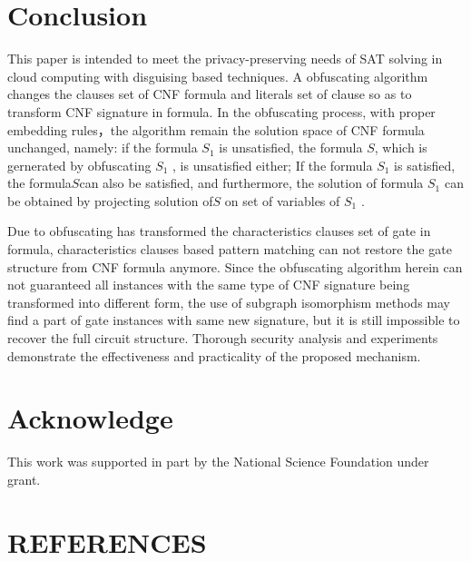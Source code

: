 \documentclass[runningheads,a4paper]{llncs}
\begin{document}
\section{Conclusion} 

This paper is intended to meet the privacy-preserving needs of SAT solving in cloud computing with disguising based techniques.
A obfuscating algorithm changes the clauses set of CNF formula and literals set of clause so as to transform CNF signature in formula. 
In the obfuscating process, with proper embedding rules，the algorithm remain the solution space of CNF formula unchanged, 
namely: if the formula $S_1$  is unsatisfied, the formula $S$, which is gernerated by obfuscating $S_1$ , is unsatisfied either;
If the formula $S_1$  is satisfied, the formula$S$can also be satisfied, 
and furthermore, the solution of formula $S_1$  can be obtained by projecting solution of$S$ on set of variables of $S_1$  .

Due to obfuscating has transformed the characteristics clauses set of gate in formula,
characteristics clauses based pattern matching can not restore the gate structure from CNF formula anymore.
Since the obfuscating algorithm herein can not guaranteed all instances with the same type of CNF signature being transformed into different form, 
the use of subgraph isomorphism methods may find a part of gate instances with same new signature,
but it is still impossible to recover the full circuit structure. 
Thorough security analysis and experiments demonstrate the effectiveness and practicality of the proposed mechanism.
\section{Acknowledge} 

This work was supported in part by the National Science Foundation under grant.

\section{REFERENCES} 
\end{document}

